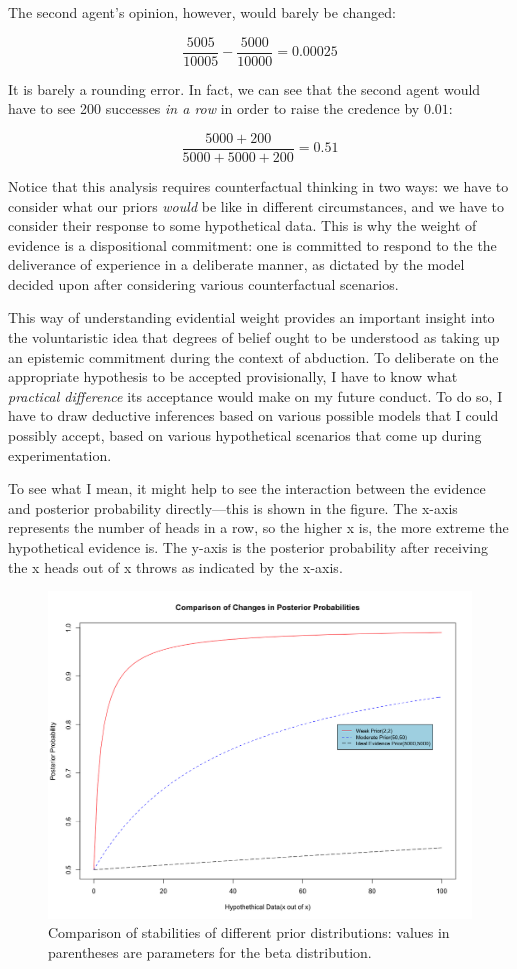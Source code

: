 The second agent's opinion, however, would barely be changed:

\[\frac{5005}{10005} - \frac{5000}{10000} = 0.00025\]

It is barely a rounding error. In fact, we can see that the second agent
would have to see 200 successes \emph{in a row} in order to raise the
credence by \(0.01\):

\[\frac{5000+200}{5000+5000+200} = 0.51\]

Notice that this analysis requires counterfactual thinking in two ways:
we have to consider what our priors \emph{would} be like in different
circumstances, and we have to consider their response to some hypothetical
data. This is why the weight of evidence is a dispositional commitment:
one is committed to respond to the the deliverance of experience in a
deliberate manner, as dictated by the model decided upon after
considering various counterfactual scenarios.

This way of understanding evidential weight provides an important
insight into the voluntaristic idea that degrees of belief ought to be
understood as taking up an epistemic commitment during the context of
abduction. To deliberate on the appropriate hypothesis to be accepted
provisionally, I have to know what \emph{practical difference} its
acceptance would make on my future conduct. To do so, I have to draw
deductive inferences based on various possible models that I could
possibly accept, based on various hypothetical scenarios that come up
during experimentation.

To see what I mean, it might help to see the interaction between the
evidence and posterior probability directly---this is shown in the
figure. The x-axis represents the number of heads in a row, so the
higher x is, the more extreme the hypothetical evidence is. The y-axis
is the posterior probability after receiving the x heads out of x throws
as indicated by the x-axis.

\begin{figure}
\centering
\includegraphics[scale=0.4]{rescompare}
\caption{Comparison of stabilities of different prior distributions:
values in parentheses are parameters for the beta distribution.}
\label{fig:res}
\end{figure}

